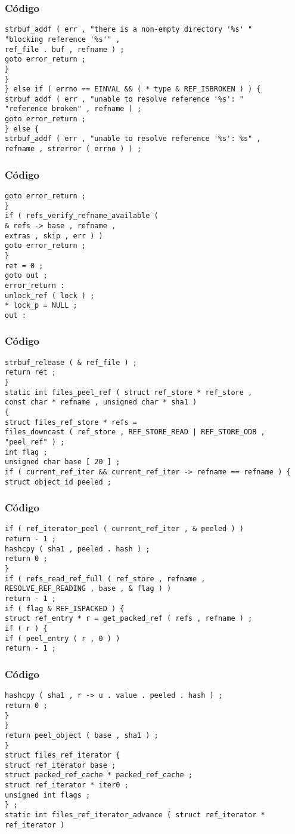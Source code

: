 \documentclass{beamer}
\begin{document}
\begin{frame}[fragile]
\frametitle{C\'odigo}
\begin{verbatim}
strbuf_addf ( err , "there is a non-empty directory '%s' " 
"blocking reference '%s'" , 
ref_file . buf , refname ) ; 
goto error_return ; 
} 
} 
} else if ( errno == EINVAL && ( * type & REF_ISBROKEN ) ) { 
strbuf_addf ( err , "unable to resolve reference '%s': " 
"reference broken" , refname ) ; 
goto error_return ; 
} else { 
strbuf_addf ( err , "unable to resolve reference '%s': %s" , 
refname , strerror ( errno ) ) ; 
\end{verbatim}
\end{frame}
\begin{frame}[fragile]
\frametitle{C\'odigo}
\begin{verbatim}
goto error_return ; 
} 
if ( refs_verify_refname_available ( 
& refs -> base , refname , 
extras , skip , err ) ) 
goto error_return ; 
} 
ret = 0 ; 
goto out ; 
error_return : 
unlock_ref ( lock ) ; 
* lock_p = NULL ; 
out : 
\end{verbatim}
\end{frame}
\begin{frame}[fragile]
\frametitle{C\'odigo}
\begin{verbatim}
strbuf_release ( & ref_file ) ; 
return ret ; 
} 
static int files_peel_ref ( struct ref_store * ref_store , 
const char * refname , unsigned char * sha1 ) 
{ 
struct files_ref_store * refs = 
files_downcast ( ref_store , REF_STORE_READ | REF_STORE_ODB , 
"peel_ref" ) ; 
int flag ; 
unsigned char base [ 20 ] ; 
if ( current_ref_iter && current_ref_iter -> refname == refname ) { 
struct object_id peeled ; 
\end{verbatim}
\end{frame}
\begin{frame}[fragile]
\frametitle{C\'odigo}
\begin{verbatim}
if ( ref_iterator_peel ( current_ref_iter , & peeled ) ) 
return - 1 ; 
hashcpy ( sha1 , peeled . hash ) ; 
return 0 ; 
} 
if ( refs_read_ref_full ( ref_store , refname , 
RESOLVE_REF_READING , base , & flag ) ) 
return - 1 ; 
if ( flag & REF_ISPACKED ) { 
struct ref_entry * r = get_packed_ref ( refs , refname ) ; 
if ( r ) { 
if ( peel_entry ( r , 0 ) ) 
return - 1 ; 
\end{verbatim}
\end{frame}
\begin{frame}[fragile]
\frametitle{C\'odigo}
\begin{verbatim}
hashcpy ( sha1 , r -> u . value . peeled . hash ) ; 
return 0 ; 
} 
} 
return peel_object ( base , sha1 ) ; 
} 
struct files_ref_iterator { 
struct ref_iterator base ; 
struct packed_ref_cache * packed_ref_cache ; 
struct ref_iterator * iter0 ; 
unsigned int flags ; 
} ; 
static int files_ref_iterator_advance ( struct ref_iterator * ref_iterator ) 
\end{verbatim}
\end{frame}
\end{document}
